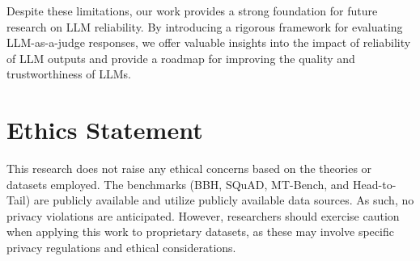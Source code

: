 \documentclass[11pt]{article}
\begin{document}
Despite these limitations, our work provides a strong foundation for future research on LLM reliability. By introducing a rigorous framework for evaluating LLM-as-a-judge responses, we offer valuable insights into the impact of reliability of LLM outputs and provide a roadmap for improving the quality and trustworthiness of LLMs.

\section{Ethics Statement}

This research does not raise any ethical concerns based on the theories or datasets employed. The benchmarks (BBH, SQuAD, MT-Bench, and Head-to-Tail) are publicly available and utilize publicly available data sources. As such, no privacy violations are anticipated. However, researchers should exercise caution when applying this work to proprietary datasets, as these may involve specific privacy regulations and ethical considerations.


%




\end{document}
